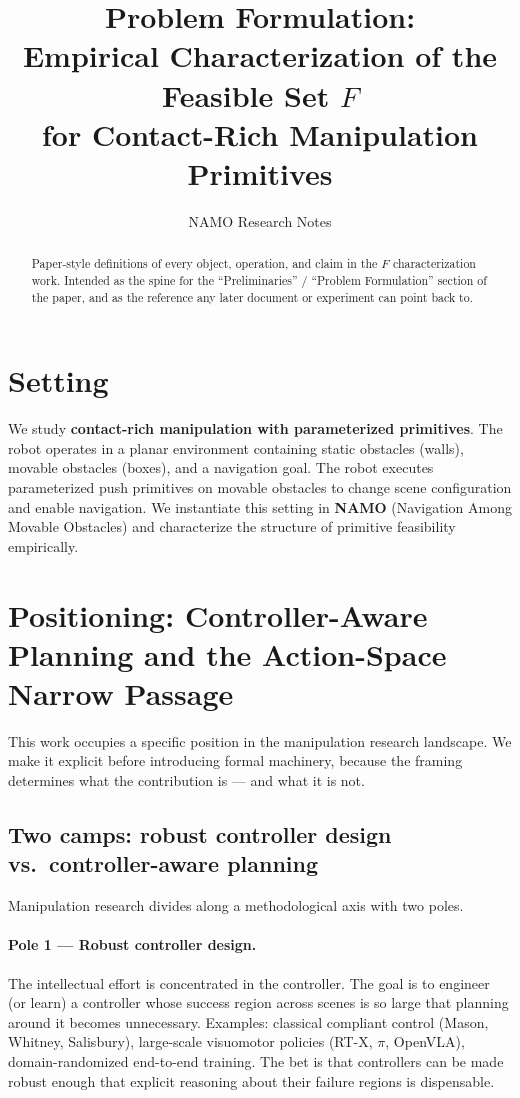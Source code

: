 \documentclass[11pt]{article}
\title{Problem Formulation:\\
Empirical Characterization of the Feasible Set $F$\\
for Contact-Rich Manipulation Primitives}
\author{NAMO Research Notes}
\date{}
\begin{document}
\maketitle

\begin{abstract}
Paper-style definitions of every object, operation, and claim in the $F$
characterization work. Intended as the spine for the ``Preliminaries'' /
``Problem Formulation'' section of the paper, and as the reference any later
document or experiment can point back to.
\end{abstract}

\section{Setting}

We study \textbf{contact-rich manipulation with parameterized primitives}. The
robot operates in a planar environment containing static obstacles (walls),
movable obstacles (boxes), and a navigation goal. The robot executes
parameterized push primitives on movable obstacles to change scene
configuration and enable navigation. We instantiate this setting in
\textbf{NAMO} (Navigation Among Movable Obstacles) and characterize the
structure of primitive feasibility empirically.

\section{Positioning: Controller-Aware Planning and the Action-Space Narrow Passage}

This work occupies a specific position in the manipulation research
landscape. We make it explicit before introducing formal machinery, because
the framing determines what the contribution is --- and what it is not.

\subsection{Two camps: robust controller design vs.\ controller-aware planning}

Manipulation research divides along a methodological axis with two poles.

\paragraph{Pole 1 --- Robust controller design.}
The intellectual effort is concentrated in the controller. The goal is to
engineer (or learn) a controller whose success region across scenes is so
large that planning around it becomes unnecessary. Examples: classical
compliant control (Mason, Whitney, Salisbury), large-scale visuomotor
policies (RT-X, $\pi$, OpenVLA), domain-randomized end-to-end training. The
bet is that controllers can be made robust enough that explicit reasoning
about their failure regions is dispensable.
\end{document}
